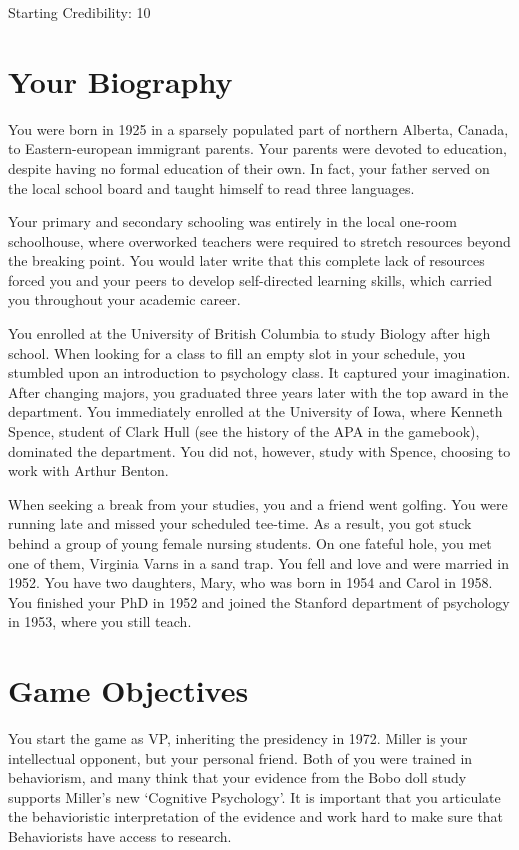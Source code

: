 \begin{refsection}
Starting Credibility: 10

\section{Your Biography}
\label{yourbiography}

You were born in 1925 in a sparsely populated part of northern Alberta, Canada, to Eastern-european immigrant parents. Your parents were devoted to education, despite having no formal education of their own. In fact, your father served on the local school board and taught himself to read three languages.

Your primary and secondary schooling was entirely in the local one-room schoolhouse, where overworked teachers were required to stretch resources beyond the breaking point. You would later write that this complete lack of resources forced you and your peers to develop self-directed learning skills, which carried you throughout your academic career.

You enrolled at the University of British Columbia to study Biology after high school. When looking for a class to fill an empty slot in your schedule, you stumbled upon an introduction to psychology class. It captured your imagination. After changing majors, you graduated three years later with the top award in the department. You immediately enrolled at the University of Iowa, where Kenneth Spence, student of Clark Hull (see the history of the APA in the gamebook), dominated the department. You did not, however, study with Spence, choosing to work with Arthur Benton.

When seeking a break from your studies, you and a friend went golfing. You were running late and missed your scheduled tee-time. As a result, you got stuck behind a group of young female nursing students. On one fateful hole, you met one of them, Virginia Varns in a sand trap. You fell and love and were married in 1952. You have two daughters, Mary, who was born in 1954 and Carol in 1958.
 
You finished your PhD in 1952 and joined the Stanford department of psychology in 1953, where you still teach.

\section{Game Objectives}
\label{gameobjectives}

You start the game as VP, inheriting the presidency in 1972. Miller is your intellectual opponent, but your personal friend. Both of you were trained in behaviorism, and many think that your evidence from the Bobo doll study supports Miller's new `Cognitive Psychology'. It is important that you articulate the behavioristic interpretation of the evidence and work hard to make sure that Behaviorists have access to research.


\end{refsection}
